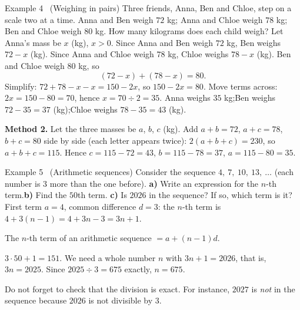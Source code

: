 \begin{exbox}{Example 4 \ (Weighing in pairs)}
Three friends, Anna, Ben and Chloe, step on a scale two at a time. Anna and Ben weigh $72$ kg; Anna and Chloe weigh $78$ kg;
Ben and Chloe weigh $80$ kg. How many kilograms does each child weigh?
\guide
{}
Let Anna's mass be $x$ (kg), $x>0$.
Since Anna and Ben weigh $72$ kg, Ben weighs $72-x$ (kg).
Since Anna and Chloe weigh $78$ kg, Chloe weighs $78-x$ (kg).
Ben and Chloe weigh $80$ kg, so
\[(72-x)+(78-x)=80.\]
Simplify: $72+78-x-x=150-2x$, so $150-2x=80$. Move terms across: $2x=150-80=70$, hence $x=70\div 2=35$.
Anna weighs $35$ kg;\quad Ben weighs $72-35=37$ (kg);\quad Chloe weighs $78-35=43$ (kg).
\begin{tipbox}\textbf{Method 2.} Let the three masses be $a$, $b$, $c$ (kg). Add $a+b=72$, $a+c=78$, $b+c=80$ side by side (each letter appears twice): $2(a+b+c)=230$, so $a+b+c=115$. Hence $c=115-72=43$, $b=115-78=37$, $a=115-80=35$.\end{tipbox}
\end{exbox}

\begin{exbox}{Example 5 \ (Arithmetic sequences)}
Consider the sequence $4,\ 7,\ 10,\ 13,\ \dots$ (each number is $3$ more than the one before).
\textbf{a)} Write an expression for the $n$-th term.\quad \textbf{b)} Find the $50$th term.\quad
\textbf{c)} Is $2026$ in the sequence? If so, which term is it?
\guide
{}
First term $a=4$, common difference $d=3$: the $n$-th term is $4+3(n-1)=4+3n-3=3n+1$.
\begin{recallbox}The $n$-th term of an arithmetic sequence $=a+(n-1)d$.\end{recallbox}
$3\cdot 50+1=151$.
We need a whole number $n$ with $3n+1=2026$, that is, $3n=2025$. Since $2025\div 3=675$ exactly, $n=675$.
\begin{warnbox}Do not forget to check that the division is exact. For instance, $2027$ is \emph{not} in the sequence because $2026$ is not divisible by $3$.\end{warnbox}
\end{exbox}

